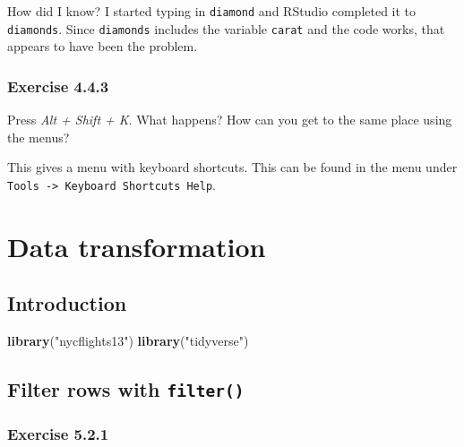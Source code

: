 \documentclass[]{book}
\newenvironment{Shaded}{\begin{snugshade}}{\end{snugshade}}
\newcommand{\KeywordTok}[1]{\textcolor[rgb]{0.13,0.29,0.53}{\textbf{#1}}}
\newcommand{\NormalTok}[1]{#1}
\newcommand{\StringTok}[1]{\textcolor[rgb]{0.31,0.60,0.02}{#1}}
\theoremstyle{plain}
\theoremstyle{remark}
\begin{document}
How did I know? I started typing in \texttt{diamond} and RStudio
completed it to \texttt{diamonds}. Since \texttt{diamonds} includes the
variable \texttt{carat} and the code works, that appears to have been
the problem.

\hypertarget{exercise-4.4.3}{%
\subsection*{\texorpdfstring{Exercise
{4.4.3}}{Exercise 4.4.3}}\label{exercise-4.4.3}}

Press \emph{Alt + Shift + K}. What happens? How can you get to the same
place using the menus?

This gives a menu with keyboard shortcuts. This can be found in the menu
under \texttt{Tools\ -\textgreater{}\ Keyboard\ Shortcuts\ Help}.

\hypertarget{data-transformation}{%
\chapter{Data transformation}\label{data-transformation}}

\hypertarget{introduction-2}{%
\section{Introduction}\label{introduction-2}}

\begin{Shaded}
\begin{Highlighting}[]
\KeywordTok{library}\NormalTok{(}\StringTok{"nycflights13"}\NormalTok{)}
\KeywordTok{library}\NormalTok{(}\StringTok{"tidyverse"}\NormalTok{)}
\end{Highlighting}
\end{Shaded}

\hypertarget{filter-rows-with-filter}{%
\section{\texorpdfstring{Filter rows with
\texttt{filter()}}{Filter rows with filter()}}\label{filter-rows-with-filter}}

\hypertarget{exercise-5.2.1}{%
\subsection*{\texorpdfstring{Exercise
{5.2.1}}{Exercise 5.2.1}}\label{exercise-5.2.1}}
\end{document}
